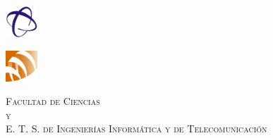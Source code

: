 \begin{titlepage}
\begin{minipage}{\textwidth}
\begin{multicols}{2}

\hfill\includegraphics[width=0.09\textwidth]{imagenes/orbitasPeq.png}\\[0.1cm]
\columnbreak
\raggedright\includegraphics[width=0.09\textwidth]{imagenes/logo_etsiit.png}\\[0.1cm]
\end{multicols}
\textsc{Facultad de Ciencias}\\
\textsc{y}\\
\textsc{E. T. S. de Ingenierías Informática y de Telecomunicación}\\
\end{minipage}
\end{titlepage}


